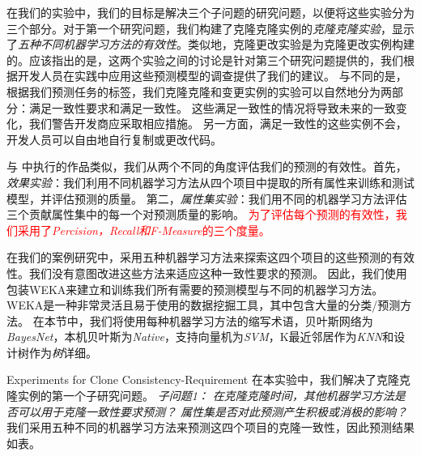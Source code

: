 {在我们的实验中，我们的目标是解决三个子问题的研究问题，以便将这些实验分为三个部分。对于第一个研究问题，我们构建了克隆克隆实例的{\em 克隆克隆实验}，显示了{\em 五种不同机器学习方法的有效性}。类似地，克隆更改实验是为克隆更改实例构建的。应该指出的是，这两个实验之间的讨论是针对第三个研究问题提供的，我们根据开发人员在实践中应用这些预测模型的调查提供了我们的建议。
与不同的是，根据我们预测任务的标签，我们克隆克隆和变更实例的实验可以自然地分为两部分：满足一致性要求和满足一致性。
这些满足一致性的情况将导致未来的一致变化，我们警告开发商应采取相应措施。
另一方面，满足一致性的这些实例不会，开发人员可以自由地自行复制或更改代码。

与\cite{wang2014predicting} \cite{zhang2016predicting}中执行的作品类似，我们从两个不同的角度评估我们的预测的有效性。首先，{\em  效果实验\/}：我们利用不同机器学习方法从四个项目中提取的所有属性来训练和测试模型，并评估预测的质量。
第二，{\em 属性集实验\/}：我们用不同的机器学习方法评估三个贡献属性集中的每一个对预测质量的影响。
\textcolor{red}{为了评估每个预测的有效性，我们采用了{\em Percision，Recall和F-Measure}的三个度量。}

在我们的案例研究中，采用五种机器学习方法来探索这四个项目的这些预测的有效性。我们没有意图改进这些方法来适应这种一致性要求的预测。
因此，我们使用包装WEKA来建立和训练我们所有需要的预测模型与不同的机器学习方法。WEKA是一种非常灵活且易于使用的数据挖掘工具，其中包含大量的分类/预测方法\cite{hall2009weka}。
在本节中，我们将使用每种机器学习方法的缩写术语，贝叶斯网络为{\em BayesNet}，本机贝叶斯为{\em Native}，支持向量机为{\em SVM}，K最近邻居作为{\em KNN}和设计树作为{\em 树}详细。

{Experiments for Clone Consistency-Requirement}
在本实验中，我们解决了克隆克隆实例的第一个子研究问题。
{\em {子问题1：}
在克隆克隆时间，其他机器学习方法是否可以用于克隆一致性要求预测？
属性集是否对此预测产生积极或消极的影响？}
我们采用五种不同的机器学习方法来预测这四个项目的克隆一致性，因此预测结果如表。

}
